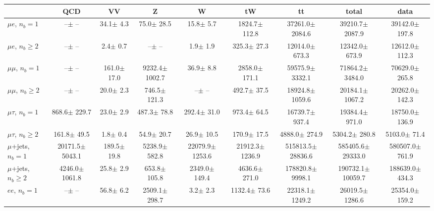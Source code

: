 \begin{sidewaystable}[p]
    \centering
    \setlength{\tabcolsep}{0.4em}
    \renewcommand{\arraystretch}{2}
    \small
    \begin{tabular}{l|cccccc|cc}
    \hline
        & QCD & VV  & Z & W & tW & tt & total & data      \\
    \hline
    
    $\mu e$, $n_b=1$                   &       --$\pm$     -- &     34.1$\pm$    4.3 &     75.0$\pm$   28.5 &     15.8$\pm$    5.7 &   1824.7$\pm$  112.8 &  37261.0$\pm$ 2084.6 &  39210.7$\pm$ 2087.9 &  39142.0$\pm$  197.8 \\ 
    $\mu e$, $n_b\geq2$                &       --$\pm$     -- &      2.4$\pm$    0.7 &       --$\pm$     -- &      1.9$\pm$    1.9 &    325.3$\pm$   27.3 &  12014.0$\pm$  673.3 &  12342.0$\pm$  673.9 &  12612.0$\pm$  112.3 \\ 
    \hline
    $\mu\mu$, $n_b=1$                  &       --$\pm$     -- &    161.0$\pm$   17.0 &   9232.4$\pm$ 1002.7 &     36.9$\pm$    8.8 &   2858.0$\pm$  171.1 &  59575.9$\pm$ 3332.1 &  71864.2$\pm$ 3484.0 &  70629.0$\pm$  265.8 \\ 
    $\mu\mu$, $n_b\geq2$               &       --$\pm$     -- &     20.0$\pm$    2.3 &    746.5$\pm$  121.3 &       --$\pm$     -- &    492.7$\pm$   37.5 &  18924.8$\pm$ 1059.6 &  20184.1$\pm$ 1067.2 &  20262.0$\pm$  142.3 \\ 
    \hline
    $\mu\tau$, $n_b=1$                 &    868.6$\pm$  229.7 &     23.0$\pm$    2.9 &    487.3$\pm$   78.8 &    292.4$\pm$   31.0 &    973.4$\pm$   64.5 &  16739.7$\pm$  937.4 &  19384.4$\pm$  971.0 &  18750.0$\pm$  136.9 \\ 
    $\mu\tau$, $n_b\geq2$              &    161.8$\pm$   49.5 &      1.8$\pm$    0.4 &     54.9$\pm$   20.7 &     26.9$\pm$   10.5 &    170.9$\pm$   17.5 &   4888.0$\pm$  274.9 &   5304.2$\pm$  280.8 &   5103.0$\pm$   71.4 \\ 
    \hline
    $\mu$+jets, $n_b=1$                &  20171.5$\pm$ 5043.1 &    189.5$\pm$   19.8 &   5238.9$\pm$  582.8 &  22079.9$\pm$ 1253.6 &  21912.3$\pm$ 1236.9 & 515813.5$\pm$28836.6 & 585405.6$\pm$29333.0 & 580507.0$\pm$  761.9 \\ 
    $\mu$+jets, $n_b\geq2$             &   4246.0$\pm$ 1061.8 &     25.8$\pm$    2.9 &    653.8$\pm$  105.8 &   2349.0$\pm$  149.4 &   4636.6$\pm$  271.0 & 178820.8$\pm$ 9998.1 & 190732.1$\pm$10059.7 & 188639.0$\pm$  434.3 \\ 
    \hline
    $e e$, $n_b=1$                     &       --$\pm$     -- &     56.8$\pm$    6.2 &   2509.1$\pm$  298.7 &      3.2$\pm$    2.3 &   1132.4$\pm$   73.6 &  22318.1$\pm$ 1249.2 &  26019.5$\pm$ 1286.6 &  25354.0$\pm$  159.2 \\ 

\end{tabular}
\end{sidewaystable}
